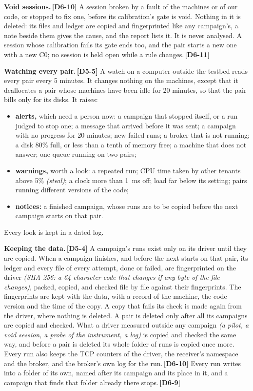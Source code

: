 \documentclass[11pt]{article}
\newcommand{\gl}[1]{{\color{soft}\itshape\small (#1)}}
\newcommand{\chg}[1]{\,{\color{chgcol}\bfseries\footnotesize[#1]}}
\newcommand{\chgold}[1]{\,{\color{oldcol}\bfseries\footnotesize[#1]}}
\begin{document}
\textbf{Void sessions.}\chg{D6-10} A session broken by a fault of the machines or of our code, or stopped to fix one, before its calibration's gate is void. Nothing in it is deleted: its files and ledger are copied and fingerprinted like any campaign's, a note beside them gives the cause, and the report lists it. It is never analysed. A session whose calibration fails its gate ends too, and the pair starts a new one with a new C0; no session is held open while a rule changes.\chg{D6-11}

\textbf{Watching every pair.}\chgold{D5-5} A watch on a computer outside the testbed reads every pair every 5 minutes. It changes nothing on the machines, except that it deallocates a pair whose machines have been idle for 20 minutes, so that the pair bills only for its disks. It raises:
\begin{itemize}
  \item \textbf{alerts,} which need a person now: a campaign that stopped itself, or a run judged to stop one; a message that arrived before it was sent; a campaign with no progress for 20 minutes; new failed runs; a broker that is not running; a disk 80\% full, or less than a tenth of memory free; a machine that does not answer; one queue running on two pairs;
  \item \textbf{warnings,} worth a look: a repeated run; CPU time taken by other tenants above 5\% \gl{steal}; a clock more than 1~ms off; load far below its setting; pairs running different versions of the code;
  \item \textbf{notices:} a finished campaign, whose runs are to be copied before the next campaign starts on that pair.
\end{itemize}
Every look is kept in a dated log.

\textbf{Keeping the data.}\chgold{D5-4} A campaign's runs exist only on its driver until they are copied. When a campaign finishes, and before the next starts on that pair, its ledger and every file of every attempt, done or failed, are fingerprinted on the driver \gl{SHA-256: a 64-character code that changes if any byte of the file changes}, packed, copied, and checked file by file against their fingerprints. The fingerprints are kept with the data, with a record of the machine, the code version and the time of the copy. A copy that fails its check is made again from the driver, where nothing is deleted. A pair is deleted only after all its campaigns are copied and checked. What a driver measured outside any campaign \gl{a pilot, a void session, a probe of the instrument, a log} is copied and checked the same way, and before a pair is deleted its whole folder of runs is copied once more. Every run also keeps the TCP counters of the driver, the receiver's namespace and the broker, and the broker's own log for the run.\chg{D6-10} Every run writes into a folder of its own, named after its campaign and its place in it, and a campaign that finds that folder already there stops.\chg{D6-9}
\end{document}
